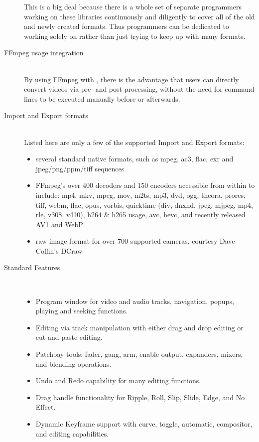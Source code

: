 \begin{description}
        This is a big deal because there is a whole set of separate programmers working on these libraries continuously and diligently to cover all of the old and newly created formats.
        Thus \CGG{} programmers can be dedicated to working solely on \CGG{} rather than just trying to keep up with many formats.
    \item[FFmpeg usage integration]~\\
        By using FFmpeg with \CGG{}, there is the advantage that users can directly convert videos via pre- and post-processing, without the need for command lines to be executed manually before or afterwards.
    \item[Import and Export formats]~\\
        Listed here are only a few of the supported Import and Export formats:
        \begin{itemize}
            \item  several standard native formats, such as mpeg, ac3, flac, exr and jpeg/png/ppm/tiff sequences
            \item FFmpeg’s over 400 decoders and 150 encoders accessible from within \CGG{} to include:
                mp4, mkv, mpeg, mov, m2ts, mp3, dvd, ogg, theora, prores, tiff, webm, flac, opus, vorbis,
                quicktime (div, dnxhd, jpeg, mjpeg, mp4, rle, v308, v410), h264 \& h265 usage, avc, hevc,
                and recently released AV1 and WebP
            \item raw image format for over 700 supported cameras, courtesy Dave Coffin's DCraw
        \end{itemize}
        \item[Standard Features]~\\
            \begin{itemize}
                \item Program window for video and audio tracks, navigation, popups, playing and seeking functions.
                \item Editing via track manipulation with either drag and drop editing or cut and paste editing.
                \item  Patchbay tools: fader, gang, arm, enable output, expanders, mixers, and blending operations.
                \item Undo and Redo capability for many editing functions.
                \item Drag handle functionality for Ripple, Roll, Slip, Slide, Edge, and No Effect.
                \item Dynamic Keyframe support with curve, toggle, automatic, compositor, and editing capabilities.

\end{itemize}
\end{description}
